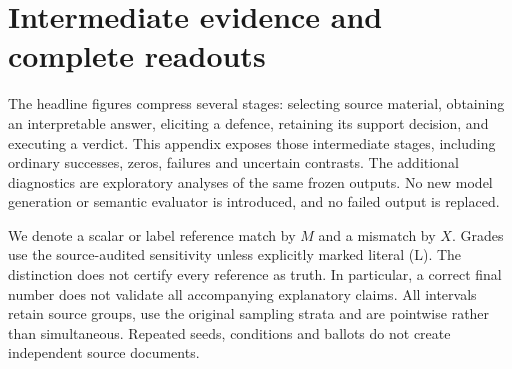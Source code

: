 \clearpage
\section{Intermediate evidence and complete readouts}
\label{app:intermediate-evidence}
The headline figures compress several stages: selecting source material,
obtaining an interpretable answer, eliciting a defence, retaining its support
decision, and executing a verdict. This appendix exposes those intermediate
stages, including ordinary successes, zeros, failures and uncertain contrasts.
The additional diagnostics are exploratory analyses of the same frozen
outputs. No new model generation or semantic evaluator is introduced, and no
failed output is replaced.

We denote a scalar or label reference match by $M$ and a mismatch by $X$.
Grades use the source-audited sensitivity unless explicitly
marked literal (L). The distinction does not certify every reference as truth.
In particular, a correct final number does not validate all accompanying
explanatory claims. All intervals retain source groups, use the original
sampling strata and are pointwise rather than simultaneous. Repeated seeds,
conditions and ballots do not create independent source documents.

